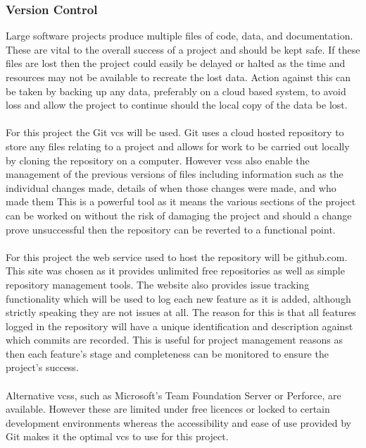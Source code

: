 		\subsubsection{Version Control}\label{sec:methodology_version_control}
			Large software projects produce multiple files of code, data, and documentation. These are vital to the overall success of a project and should be kept safe. If these files are lost then the project could easily be delayed or halted as the time and resources may not be available to recreate the lost data. Action against this can be taken by backing up any data, preferably on a cloud based system, to avoid loss and allow the project to continue should the local copy of the data be lost.
			\\\\
			For this project the Git \gls{vcs} will be used. Git uses a cloud hosted repository to store any files relating to a project and allows for work to be carried out locally by cloning the repository on a computer. However \glspl{vcs} also enable the management of the previous versions of files including information such as the individual changes made, details of when those changes were made, and who made them This is a powerful tool as it means the various sections of the project can be worked on without the risk of damaging the project and should a change prove unsuccessful then the repository can be reverted to a functional point.
			\\\\
			For this project the web service used to host the repository will be github.com. This site was chosen as it provides unlimited free repositories as well as simple repository management tools. The website also provides issue tracking functionality which will be used to log each new feature as it is added, although strictly speaking they are not issues at all. The reason for this is that all features logged in the repository will have a unique identification and description against which commits are recorded. This is useful for project management reasons as then each feature’s stage and completeness can be monitored to ensure the project’s success.
			\\\\
			Alternative \glspl{vcs}, such as Microsoft’s Team Foundation Server or Perforce, are available. However these are limited under free licences or locked to certain development environments whereas the accessibility and ease of use provided by Git makes it the optimal \gls{vcs} to use for this project.
